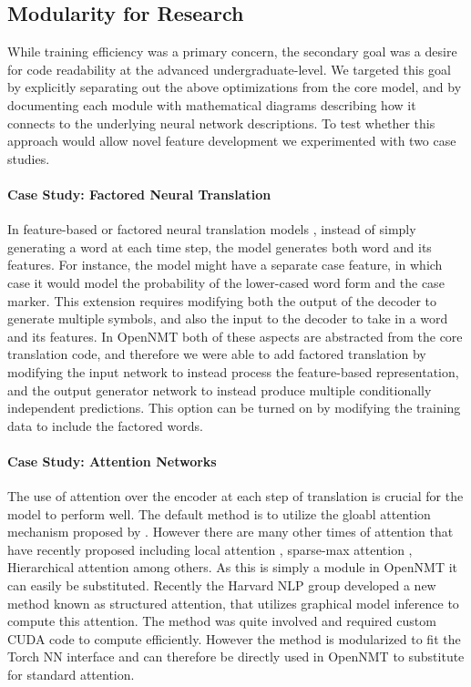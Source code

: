\documentclass[11pt]{article}
\begin{document}
\subsection{Modularity for Research}

While training efficiency was a primary concern, the secondary goal
was a desire for code readability at the 
advanced undergraduate-level.  We targeted this goal by explicitly
separating out the above optimizations from the core model, and by 
documenting each module with mathematical diagrams describing how 
it connects to the underlying neural network descriptions. To test whether 
this approach would allow novel feature development we experimented with 
two case studies. 

\paragraph{Case Study: Factored Neural Translation}

In feature-based or factored neural translation models
\cite{sennrich2016linguistic}, instead of simply generating a word at
each time step, the model generates both word and its features. For
instance, the model might have a separate case feature, in which case
it would model the probability of the lower-cased word form and the
case marker. This extension requires modifying both the output of the
decoder to generate multiple symbols, and also the input to the
decoder to take in a word and its features. In OpenNMT both of these
aspects are abstracted from the core translation code, and therefore
we were able to add factored translation by modifying the input
network to instead process the feature-based representation, and the
output generator network to instead produce multiple conditionally
independent predictions.  This option can be turned on by modifying
the training data to include the factored words.

\paragraph{Case Study: Attention Networks}

The use of attention over the encoder at each step of translation is
crucial for the model to perform well. The default method is to
utilize the gloabl attention mechanism proposed by \cite{}. However
there are many other times of attention that have recently proposed
including local attention \cite{Luong2015}, sparse-max attention
\cite{martins2016softmax}, Hierarchical attention
\cite{yang2016hierarchical} among others. As this is simply a module
in OpenNMT it can easily be substituted. Recently the Harvard NLP
group developed a new method known as structured attention,
that utilizes graphical model inference to compute this attention. The
method was quite involved and required custom CUDA code to compute
efficiently. However the method is modularized to fit the Torch NN
interface and can therefore be directly used in OpenNMT to substitute
for standard attention.
\end{document}
